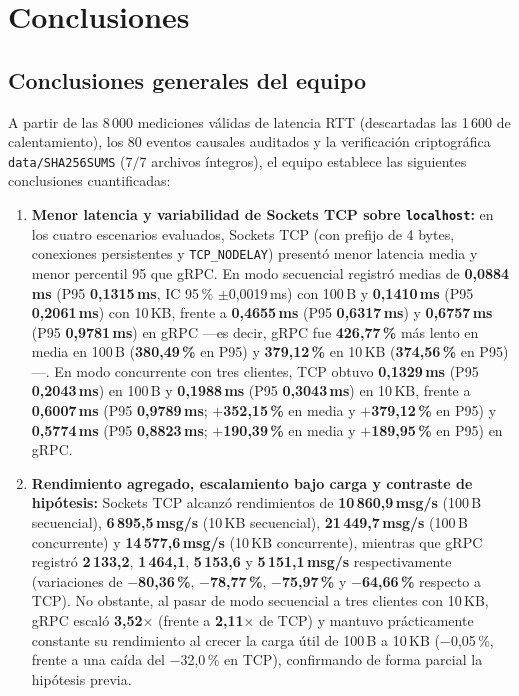 \documentclass[12pt,a4paper]{article}
\begin{document}
\section{Conclusiones}
\label{sec:conclusiones}

\subsection{Conclusiones generales del equipo}

A partir de las 8\,000 mediciones válidas de latencia RTT (descartadas las 1\,600 de calentamiento), los 80 eventos causales auditados y la verificación criptográfica \texttt{data/SHA256SUMS} ($7/7$ archivos íntegros), el equipo establece las siguientes conclusiones cuantificadas:
\begin{enumerate}
  \item \textbf{Menor latencia y variabilidad de Sockets TCP sobre \texttt{localhost}:} en los cuatro escenarios evaluados, Sockets TCP (con prefijo de 4 bytes, conexiones persistentes y \texttt{TCP\_NODELAY}) presentó menor latencia media y menor percentil 95 que gRPC. En modo secuencial registró medias de \textbf{0,0884\,ms} (P95 \textbf{0,1315\,ms}, IC 95\,\% $\pm$0,0019\,ms) con 100\,B y \textbf{0,1410\,ms} (P95 \textbf{0,2061\,ms}) con 10\,KB, frente a \textbf{0,4655\,ms} (P95 \textbf{0,6317\,ms}) y \textbf{0,6757\,ms} (P95 \textbf{0,9781\,ms}) en gRPC ---es decir, gRPC fue \textbf{426,77\,\%} más lento en media en 100\,B (\textbf{380,49\,\%} en P95) y \textbf{379,12\,\%} en 10\,KB (\textbf{374,56\,\%} en P95)---. En modo concurrente con tres clientes, TCP obtuvo \textbf{0,1329\,ms} (P95 \textbf{0,2043\,ms}) en 100\,B y \textbf{0,1988\,ms} (P95 \textbf{0,3043\,ms}) en 10\,KB, frente a \textbf{0,6007\,ms} (P95 \textbf{0,9789\,ms}; \textbf{$+$352,15\,\%} en media y \textbf{$+$379,12\,\%} en P95) y \textbf{0,5774\,ms} (P95 \textbf{0,8823\,ms}; \textbf{$+$190,39\,\%} en media y \textbf{$+$189,95\,\%} en P95) en gRPC.
  \item \textbf{Rendimiento agregado, escalamiento bajo carga y contraste de hipótesis:} Sockets TCP alcanzó rendimientos de \textbf{10\,860,9\,msg/s} (100\,B secuencial), \textbf{6\,895,5\,msg/s} (10\,KB secuencial), \textbf{21\,449,7\,msg/s} (100\,B concurrente) y \textbf{14\,577,6\,msg/s} (10\,KB concurrente), mientras que gRPC registró \textbf{2\,133,2}, \textbf{1\,464,1}, \textbf{5\,153,6} y \textbf{5\,151,1\,msg/s} respectivamente (variaciones de \textbf{$-$80,36\,\%}, \textbf{$-$78,77\,\%}, \textbf{$-$75,97\,\%} y \textbf{$-$64,66\,\%} respecto a TCP). No obstante, al pasar de modo secuencial a tres clientes con 10\,KB, gRPC escaló \textbf{3,52$\times$} (frente a \textbf{2,11$\times$} de TCP) y mantuvo prácticamente constante su rendimiento al crecer la carga útil de 100\,B a 10\,KB ($-$0,05\,\%, frente a una caída del $-$32,0\,\% en TCP), confirmando de forma parcial la hipótesis previa.

\end{enumerate}
\end{document}
